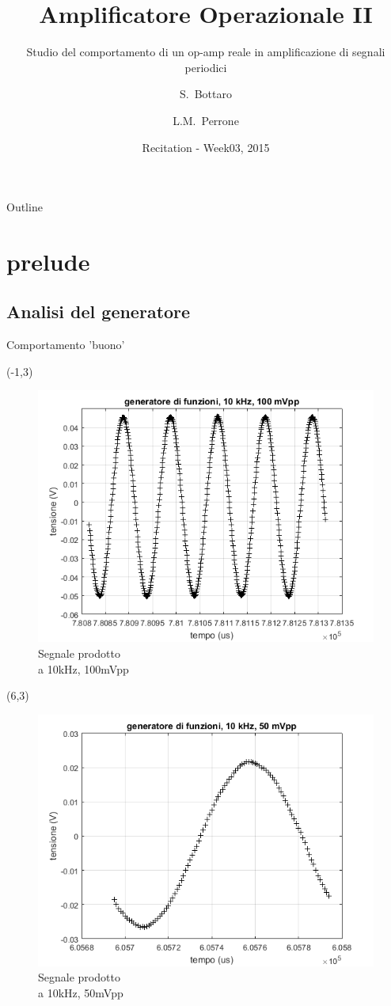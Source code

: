 \documentclass{beamer}
\title{Amplificatore Operazionale II}
\subtitle{Studio del comportamento di un op-amp reale in amplificazione di segnali periodici}
\author{S.~Bottaro\inst{1} \and L.M.~Perrone\inst{1}}
\institute[Unipi] %
{
  \inst{1}%
  Dipartimento di Fisica\\
  Universita' di Pisa
}
\date{Recitation - Week03, 2015}
\begin{document}
\begin{frame}
  \titlepage
\end{frame}

\begin{frame}{Outline}
  \tableofcontents
\end{frame}


\section{prelude}
\subsection{Analisi del generatore}

\begin{frame}{Comportamento 'buono'}

\begin{textblock}{12}(-1,3)
\begin{figure}
\centering
\includegraphics[width=0.6\linewidth]{./prova_gen_10khz_100mpp}
\caption{Segnale prodotto \\
a 10kHz, 100mVpp}
\label{fig:prova_gen_10khz_100mpp}
\end{figure}
\end{textblock}


\begin{textblock}{12}(6,3)
\begin{figure}
\centering
\includegraphics[width=0.6\linewidth]{./prova_gen_10khz_50mpp}
\caption{Segnale prodotto \\
a 10kHz, 50mVpp}
\label{fig:prova_gen_10khz_50mpp}
\end{figure}
\end{textblock}


\end{frame}
\end{document}
